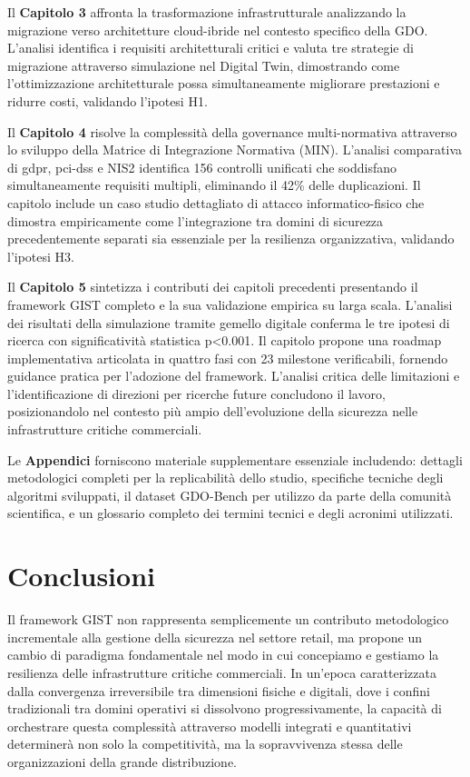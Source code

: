 Il \textbf{Capitolo 3} affronta la trasformazione infrastrutturale analizzando la migrazione verso architetture cloud-ibride nel contesto specifico della GDO. L'analisi identifica i requisiti architetturali critici e valuta tre strategie di migrazione attraverso simulazione nel Digital Twin, dimostrando come l'ottimizzazione architetturale possa simultaneamente migliorare prestazioni e ridurre costi, validando l'ipotesi H1.

Il \textbf{Capitolo 4} risolve la complessità della governance multi-normativa attraverso lo sviluppo della Matrice di Integrazione Normativa (MIN). L'analisi comparativa di \gls{gdpr}, \gls{pci-dss} e NIS2 identifica 156 controlli unificati che soddisfano simultaneamente requisiti multipli, eliminando il 42\% delle duplicazioni. Il capitolo include un caso studio dettagliato di attacco informatico-fisico che dimostra empiricamente come l'integrazione tra domini di sicurezza precedentemente separati sia essenziale per la resilienza organizzativa, validando l'ipotesi H3.

Il \textbf{Capitolo 5} sintetizza i contributi dei capitoli precedenti presentando il framework GIST completo e la sua validazione empirica su larga scala. L'analisi dei risultati della simulazione tramite gemello digitale conferma le tre ipotesi di ricerca con significatività statistica p<0.001. Il capitolo propone una roadmap implementativa articolata in quattro fasi con 23 milestone verificabili, fornendo guidance pratica per l'adozione del framework. L'analisi critica delle limitazioni e l'identificazione di direzioni per ricerche future concludono il lavoro, posizionandolo nel contesto più ampio dell'evoluzione della sicurezza nelle infrastrutture critiche commerciali.

Le \textbf{Appendici} forniscono materiale supplementare essenziale includendo: dettagli metodologici completi per la replicabilità dello studio, specifiche tecniche degli algoritmi sviluppati, il dataset GDO-Bench per utilizzo da parte della comunità scientifica, e un glossario completo dei termini tecnici e degli acronimi utilizzati.

\section{\texorpdfstring{Conclusioni}{1.6 - Conclusioni}}
\label{sec:conclusioni_cap1}

Il framework GIST non rappresenta semplicemente un contributo metodologico incrementale alla gestione della sicurezza nel settore retail, ma propone un cambio di paradigma fondamentale nel modo in cui concepiamo e gestiamo la resilienza delle infrastrutture critiche commerciali. In un'epoca caratterizzata dalla convergenza irreversibile tra dimensioni fisiche e digitali, dove i confini tradizionali tra domini operativi si dissolvono progressivamente, la capacità di orchestrare questa complessità attraverso modelli integrati e quantitativi determinerà non solo la competitività, ma la sopravvivenza stessa delle organizzazioni della grande distribuzione.

